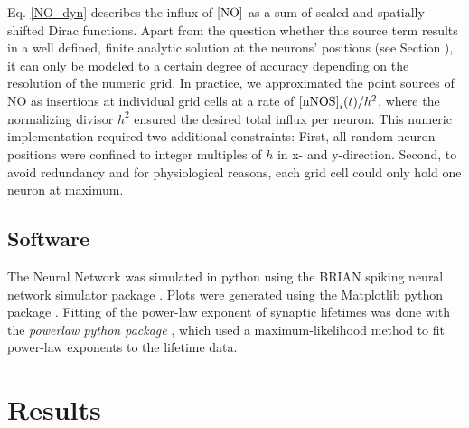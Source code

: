 \documentclass[10pt,letterpaper]{article}
\begin{document}
Eq. \eqref{NO_dyn} describes the influx of $\rm [NO]$ as a sum of scaled and spatially shifted Dirac functions. Apart from the question whether this source term results in a well defined, finite analytic solution at the neurons' positions (see Section \textit{}), it can only be modeled to a certain degree of accuracy depending on the resolution of the numeric grid. In practice, we approximated the point sources of NO as insertions at individual grid cells at a rate of ${\rm [nNOS]}_i(t) / h^2$, where the normalizing divisor $h^2$ ensured the desired total influx per neuron. This numeric implementation required two additional constraints: First, all random neuron positions were confined to integer multiples of $h$ in x- and y-direction. Second, to avoid redundancy and for physiological reasons, each grid cell could only hold one neuron at maximum.

\subsection*{Software}
The Neural Network was simulated in python using the BRIAN spiking neural network simulator package \cite{Briansim}. Plots were generated using the Matplotlib python package \cite{Matplotlib}. Fitting of the power-law exponent of synaptic lifetimes was done with the \textit{powerlaw python package} \cite{Powerlaw_Package}, which used a maximum-likelihood method to fit power-law exponents to the lifetime data.

\section*{Results}
\end{document}
